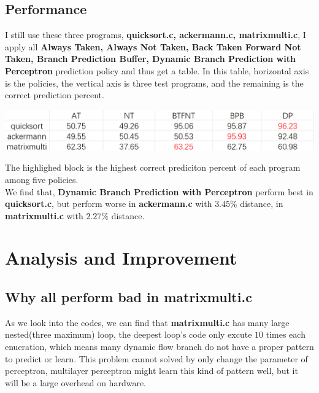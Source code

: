 \documentclass{article}
\begin{document}
\subsection{Performance}
I still use these three programs, \textbf{quicksort.c, ackermann.c, matrixmulti.c}, I apply all \textbf{Always Taken, Always Not Taken, Back Taken Forward Not Taken, Branch Prediction Buffer, Dynamic Branch Prediction with Perceptron} prediction policy and thus get a table. In this table, horizontal axis is the policies, the vertical axis is three test programs, and the remaining is the correct prediction percent.
\begin{center}
  \includegraphics[scale = 0.3]{naive result.png}\\
\end{center}
The highlighed block is the highest correct prediciton percent of each program among five policies. \\
We find that, \textbf{Dynamic Branch Prediction with Perceptron} perform best in \textbf{quicksort.c}, but perform worse in \textbf{ackermann.c} with $3.45\%$ distance, in \textbf{matrixmulti.c} with $2.27\%$ distance.

\section{Analysis and Improvement}
\subsection{Why all perform bad in \textbf{matrixmulti.c}}
As we look into the codes, we can find that \textbf{matrixmulti.c} has many large nested(three maximum) loop, the deepest loop's code only excute $10$ times each enueration, which means many dynamic flow branch do not have a proper pattern to predict or learn. This problem cannot solved by only change the parameter of perceptron, multilayer perceptron might learn this kind of pattern well, but it will be a large overhead on hardware.
\end{document}
